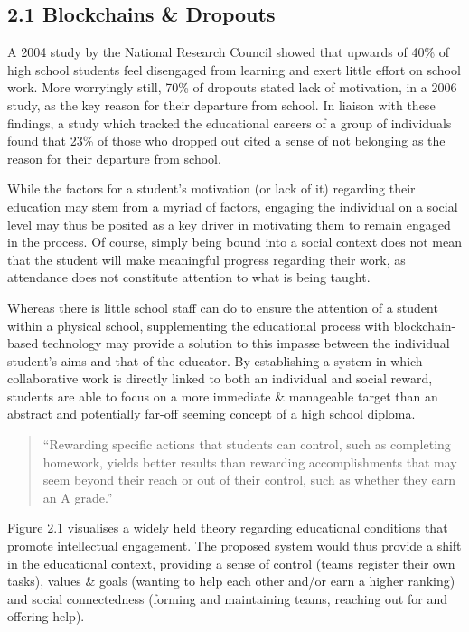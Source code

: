 \documentclass[12pt]{report}
\begin{document}
\subsection{2.1 Blockchains \& Dropouts}\label{blockchains-dropouts}

A 2004 study by the National Research Council showed that upwards of
40\% of high school students feel disengaged from learning and exert
little effort on school work\cite{Usher2013}. More worryingly still, 70\% of dropouts stated
lack of motivation, in a 2006 study, as the key reason for their
departure from school\cite{bridgeland2006silent}. In liaison with these
findings, a study which tracked the educational careers of a group of
individuals found that 23\% of those who dropped out cited a sense of
not belonging as the reason for their departure from school\cite{berktold1998subsequent}.

While the factors for a student's motivation (or lack of it) regarding
their education may stem from a myriad of factors, engaging the
individual on a social level may thus be posited as a key driver in
motivating them to remain engaged in the process\cite{johnson2001students}. Of course, simply being
bound into a social context does not mean that the student will make
meaningful progress regarding their work, as attendance does not
constitute attention to what is being taught.

Whereas there is little school staff can do to ensure the attention of a
student within a physical school, supplementing the educational process
with blockchain-based technology may provide a solution to this impasse
between the individual student's aims and that of the educator. By
establishing a system in which collaborative work is directly linked to
both an individual and social reward, students are able to focus on a
more immediate \& manageable target than an abstract and potentially
far-off seeming concept of a high school diploma.

\begin{quote}
``Rewarding specific actions that students can control, such as
completing homework, yields better results than rewarding
accomplishments that may seem beyond their reach or out of their
control, such as whether they earn an A grade.''\cite{Usher2013}
\end{quote}

Figure 2.1 visualises a widely held theory regarding educational
conditions that promote intellectual engagement\cite{CommitteeonIncreasingHighSchoolStudentsEngagementandMotivationtoLearn2003}. The proposed system would thus provide
a shift in the educational context, providing a sense of control (teams
register their own tasks), values \& goals (wanting to help each other
and/or earn a higher ranking) and social connectedness (forming and
maintaining teams, reaching out for and offering help).
\end{document}
